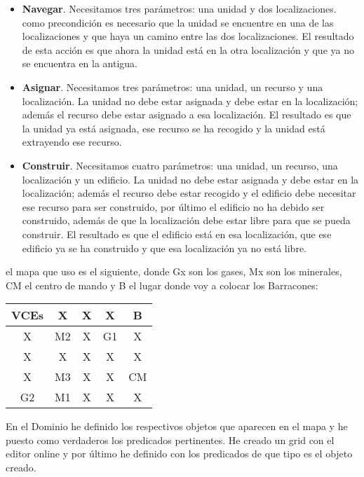 \documentclass[a4paper,11pt]{article}
\begin{document}
\begin{itemize}
\item \textbf{Navegar}. Necesitamos tres parámetros: una unidad y dos localizaciones. como precondición es necesario que la unidad se encuentre en una de las localizaciones y que haya un camino entre las dos localizaciones. El resultado de esta acción es que ahora la unidad está en la otra localización y que ya no se encuentra en la antigua.
\item \textbf{Asignar}. Necesitamos tres parámetros: una unidad, un recurso y una localización. La unidad no debe estar asignada y debe estar en la localización; además el recurso debe estar asignado a esa localización. El resultado es que la unidad ya está asignada, ese recurso se ha recogido y la unidad está extrayendo ese recurso.
\item \textbf{Construir}. Necesitamos cuatro parámetros: una unidad, un recurso, una localización y un edificio. La unidad no debe estar asignada y debe estar en la localización; además el recurso debe estar recogido y el edificio debe necesitar ese recurso para ser construido, por último el edificio no ha debido ser construido, además de que la localización debe estar libre para que se pueda construir. El resultado es que el edificio está en esa localización, que ese edificio ya se ha construido y que esa localización ya no está libre.
\end{itemize}
\newpage

el mapa que uso es el siguiente, donde Gx son los gases, Mx son los minerales, CM el centro de mando y B el lugar donde voy a colocar los Barracones:
\begin{table}[h]
\begin{tabular}{|c|c|c|c|c|}
\hline
VCEs & X  & X & X  & B  \\ \hline
X    & M2 & X & G1 & X  \\ \hline
X    & X  & X & X  & X  \\ \hline
X    & M3 & X & X  & CM \\ \hline
G2   & M1 & X & X  & X  \\ \hline
\end{tabular}
\end{table}

En el Dominio he definido los respectivos objetos que aparecen en el mapa y he puesto como verdaderos los predicados pertinentes. He creado un grid con el editor online y por último he definido con los predicados de que tipo es el objeto creado.\\
\end{document}

